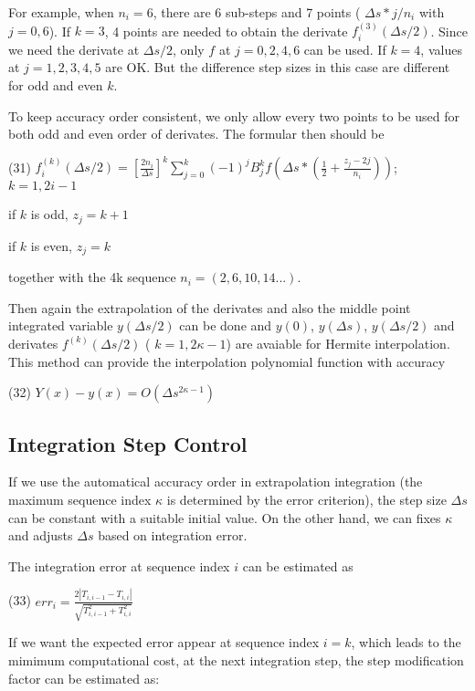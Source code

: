 For example, when $ n_i = 6 $, there are 6 sub-\/steps and 7 points ( $ \Delta s*j/n_i $ with $j=0,6$). If $ k = 3 $, 4 points are needed to obtain the derivate $ f_i^{(3)}(\Delta s/2) $. Since we need the derivate at $ \Delta s/2 $, only $ f $ at $ j = 0,2,4,6 $ can be used. If $ k = 4 $, values at $ j= 1,2,3,4,5$ are OK. But the difference step sizes in this case are different for odd and even $ k$.

To keep accuracy order consistent, we only allow every two points to be used for both odd and even order of derivates. The formular then should be

(31) $ f_i^{(k)}(\Delta s/2) = \left[ \frac{2n_i}{\Delta s} \right]^k \sum_{j=0}^k (-1)^j B_j^k f(\Delta s*(\frac{1}{2}+\frac{z_j-2j}{n_i})) $; $ k=1,2i-1 $
\begin{DoxyItemize}
\item if $k$ is odd, $ z_j = k+1 $
\item if $k$ is even, $ z_j = k $
\end{DoxyItemize}

together with the 4k sequence $ n_i =(2, 6, 10, 14 ...) $.

Then again the extrapolation of the derivates and also the middle point integrated variable $ y(\Delta s/2) $ can be done and $ y(0) $, $ y(\Delta s) $, $ y(\Delta s/2) $ and derivates $ f^{(k)}(\Delta s/2) $ ( $ k =1,2\kappa-1 $) are avaiable for Hermite interpolation. This method can provide the interpolation polynomial function with accuracy

(32) $ Y(x) - y(x) = O(\Delta s^{2\kappa-1}) $\hypertarget{index_step_sec}{}\subsection{Integration Step Control}\label{index_step_sec}
If we use the automatical accuracy order in extrapolation integration (the maximum sequence index $\kappa $ is determined by the error criterion), the step size $\Delta s$ can be constant with a suitable initial value. On the other hand, we can fixes $ \kappa $ and adjusts $ \Delta s$ based on integration error.

The integration error at sequence index $ i$ can be estimated as

(33) $ err_i = \frac{2|T_{i,i-1} - T_{i,i}|}{\sqrt{T_{i,i-1}^2 + T_{i,i}^2}}$

If we want the expected error appear at sequence index $ i = k $, which leads to the mimimum computational cost, at the next integration step, the step modification factor can be estimated as\+:


